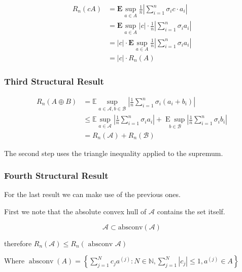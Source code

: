 \documentclass[a4paper, 11pt]{article} %
\begin{document}
\begin{align*}
R _ { n } (cA ) &=  \mathbf { E } \sup _ { a \in A } \frac { 1 } { n } \left| \sum _ { i = 1 } ^ { n } \sigma _ { i } c \cdot a _ { i } \right| \\
&=\mathbf { E } \sup _ { a \in A }  |c| \cdot \frac { 1 } { n } \left| \sum _ { i = 1 } ^ { n } \sigma _ { i } a _ { i } \right| \\
&= |c| \cdot \mathbf { E } \sup _ { a \in A }  \frac { 1 } { n } \left| \sum _ { i = 1 } ^ { n } \sigma _ { i } a _ { i } \right| \\
&= |c| \cdot R _ { n } ( A )
\end{align*}

\subsubsection*{Third Structural Result}

\begin{align*}
R _ { n } ( A \oplus B ) &= \mathbb { E } \sup _ { a \in \mathcal { A } , b \in \mathcal { B } } \left| \frac { 1 } { n } \sum _ { i = 1 } ^ { n } \sigma _ { i } \left( a _ { i } + b _ { i } \right) \right| \\
&\leq \mathbb { E } \sup _ { a \in \mathcal { A } } \left| \frac { 1 } { n } \sum _ { i = 1 } ^ { n } \sigma _ { i } a _ { i } \right| + \underset { b \in \mathcal { B } } { \operatorname { E } \sup } \left| \frac { 1 } { n } \sum _ { i = 1 } ^ { n } \sigma _ { i } b _ { i } \right| \\
&= R _ { n } ( \mathcal { A } ) + R _ { n } ( \mathcal { B } )
\end{align*}

The second step uses the triangle inequality applied to the supremum.

\subsubsection*{Fourth Structural Result}

For the last result we can make use of the previous ones. 

First we note that the absolute convex hull of $\mathcal{A}$ contains the set itself. 

$$\mathcal { A } \subset \text {absconv} (\mathcal { A })$$

therefore $R _ { n } ( \mathcal { A } ) \leq R _ { n } ( \text { absconv } \mathcal { A } )$

Where $\operatorname { absconv } ( A ) = \left\{ \sum _ { j = 1 } ^ { N } c _ { j } a ^ { ( j ) } : N \in \mathbb { N } , \sum _ { j = 1 } ^ { N } \left| c _ { j } \right| \leq 1 , a ^ { ( j ) } \in A \right\}$ \\
\end{document}
